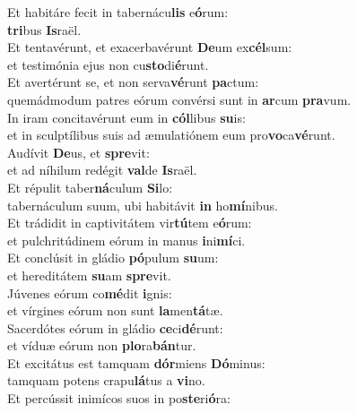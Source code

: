 \oddverse Et habitáre fecit in tabernácu\textbf{lis} e\textbf{ó}rum:~\*\\
\oddverse \textbf{tri}bus \textbf{Is}raël.\\
\evenverse Et tentavérunt, et exacerbavérunt \textbf{De}um ex\textbf{cél}sum:~\*\\
\evenverse et testimónia ejus non cu\textbf{sto}di\textbf{é}runt.\\
\oddverse Et avertérunt se, et non serva\textbf{vé}runt \textbf{pa}ctum:~\*\\
\oddverse quemádmodum patres eórum convérsi sunt in \textbf{ar}cum \textbf{pra}vum.\\
\evenverse In iram concitavérunt eum in \textbf{cól}libus \textbf{su}is:~\*\\
\evenverse et in sculptílibus suis ad æmulatiónem eum pro\textbf{vo}ca\textbf{vé}runt.\\
\oddverse Audívit \textbf{De}us, et \textbf{spre}vit:~\*\\
\oddverse et ad níhilum redégit \textbf{val}de \textbf{Is}raël.\\
\evenverse Et répulit taber\textbf{ná}culum \textbf{Si}lo:~\*\\
\evenverse tabernáculum suum, ubi habitávit \textbf{in} ho\textbf{mí}nibus.\\
\oddverse Et trádidit in captivitátem vir\textbf{tú}tem e\textbf{ó}rum:~\*\\
\oddverse et pulchritúdinem eórum in manus \textbf{i}ni\textbf{mí}ci.\\
\evenverse Et conclúsit in gládio \textbf{pó}pulum \textbf{su}um:~\*\\
\evenverse et hereditátem \textbf{su}am \textbf{spre}vit.\\
\oddverse Júvenes eórum co\textbf{mé}dit \textbf{i}gnis:~\*\\
\oddverse et vírgines eórum non sunt \textbf{la}men\textbf{tá}tæ.\\
\evenverse Sacerdótes eórum in gládio \textbf{ce}ci\textbf{dé}runt:~\*\\
\evenverse et víduæ eórum non \textbf{plo}ra\textbf{bán}tur.\\
\oddverse Et excitátus est tamquam \textbf{dór}miens \textbf{Dó}minus:~\*\\
\oddverse tamquam potens crapu\textbf{lá}tus a \textbf{vi}no.\\
\evenverse Et percússit inimícos suos in po\textbf{ste}ri\textbf{ó}ra:~\*\\
